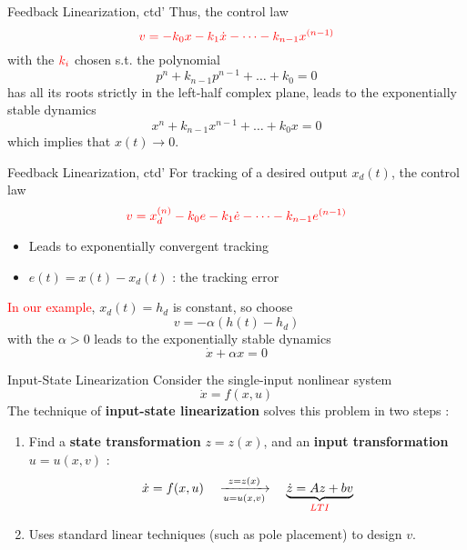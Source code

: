 \documentclass{beamer}
\begin{document}
  \begin{frame}{Feedback Linearization, ctd'}
    Thus, the control law
    $$ {\color{red}v = -k_{0}x-k_{1}\dot{x}- \dots - k_{n-1}x^{(n-1)}} $$
    with the ${\color{red}k_{i}}$ chosen s.t. the polynomial
    $$p^{n}+k_{n-1}p^{n-1} + \dots + k_{0}=0$$
    has all its roots strictly in the left-half complex plane, leads to the {\color{red}exponentially stable dynamics}
    $$
    x^{n}+k_{n-1}x^{n-1}+\dots+k_{0}x = 0
    $$
    which implies that $x(t) \rightarrow 0$.
  \end{frame}


  \begin{frame}{Feedback Linearization, ctd'}
    For tracking of a desired output $x_{d}(t)$, the control law
    \begin{equation}\label{tracking}
      {\color{red}v = x_{d}^{(n)} - k_{0}e - k_{1}\dot{e}-\dots-k_{n-1}e^{(n-1)}}
    \end{equation}
    \vspace{-20pt}
    \begin{itemize}
        \item Leads to exponentially convergent tracking
        \item $e(t) = x(t)-x_{d}(t)$ : the tracking error
    \end{itemize}
    \textcolor{red}{In our example}, $x_{d}(t)=h_{d}$ is constant, so choose
    $$v=-\alpha(h(t) - h_{d})$$
    with the $\alpha > 0$ leads to the exponentially stable dynamics
    $$ \dot{x} + \alpha x=0 $$
  \end{frame}


  \begin{frame}{Input-State Linearization}
    Consider the single-input nonlinear system
    $$ \dot{x} = f(x,u) $$
    The technique of \textbf{input-state linearization} solves this problem in two steps :
    \begin{enumerate}
      \item Find a \textbf{state transformation} $z=z(x)$, and an \textbf{input transformation} $u=u(x,v)$ :
          $$ \dot{x} = f(x,u) \quad \xrightarrow[u=u(x,v)]{z=z(x)} \quad \underbrace{\dot{z}=Az+bv}_{{\color{red}LTI}} $$
      \item Uses standard linear techniques (such as pole placement) to design $v$.
    \end{enumerate}
  \end{frame}
\end{document}
